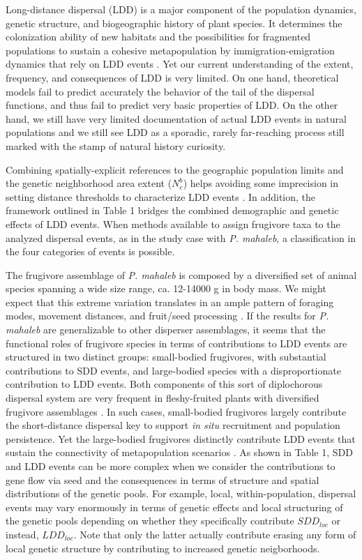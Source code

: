 \documentclass[a4paper, 12pt]{article}
\begin{document}
\begin{linenumbers}
Long-distance dispersal (LDD) is a major component of the population dynamics, genetic structure, and biogeographic history of plant species. It determines the colonization ability of new habitats and the possibilities for fragmented populations to sustain a cohesive metapopulation by immigration-emigration dynamics that rely on LDD events \citep{Nathan:2008is,Schurr2009long}. Yet our current understanding of the extent, frequency, and consequences of LDD is very limited. On one hand, theoretical models fail to predict accurately the behavior of the tail of the dispersal functions, and thus fail to predict very basic properties of LDD. On the other hand, we still have very limited documentation of actual LDD events in natural populations and we still see LDD as a sporadic, rarely far-reaching process still marked with the stamp of natural history curiosity.

Combining spatially-explicit references to the geographic population limits and the genetic neighborhood area extent ($N^b_e$) helps avoiding some imprecision in setting distance thresholds to characterize LDD events \citep{Jones:2008il}. In addition, the framework outlined in Table 1 bridges the combined demographic and genetic effects of LDD events. When methods available to assign frugivore taxa to the analyzed dispersal events, as in the study case with \textit{P. mahaleb}, a classification in the four categories of events is possible. 

The frugivore assemblage of \textit{P. mahaleb} is composed by a diversified set of animal species spanning a wide size range, ca. 12-14000 g in body mass. We might expect that this extreme variation translates in an ample pattern of foraging modes, movement distances, and fruit/seed processing \citep{Jordano:2000ft}. If the results for \textit{P. mahaleb} are generalizable to other disperser assemblages, it seems that the functional roles of frugivore species in terms of contributions to LDD events are structured in two distinct groups: small-bodied frugivores, with substantial contributions to SDD events, and large-bodied species with a disproportionate contribution to LDD events. Both components of this sort of diplochorous \citep{vanderWall:2004hv} dispersal system are very frequent in fleshy-fruited plants with diversified frugivore assemblages \citep{Galetti:2013jv}. In such cases, small-bodied frugivores largely contribute the short-distance dispersal key to support \textit{in situ} recruitment and population persistence. Yet the large-bodied frugivores distinctly contribute LDD events that sustain the connectivity of metapopulation scenarios \citep{Urban:2001}. As shown in Table 1, SDD and LDD events can be more complex when we consider the contributions to gene flow via seed and the consequences in terms of structure and spatial distributions of the genetic pools. For example, local, within-population, dispersal events may vary enormously in terms of genetic effects and local structuring of the genetic pools depending on whether they specifically contribute $SDD_{loc}$ or instead, $LDD_{loc}$. Note that only the latter actually contribute erasing any form of local genetic structure by contributing to increased genetic neigborhoods.


\end{linenumbers}
\end{document}
